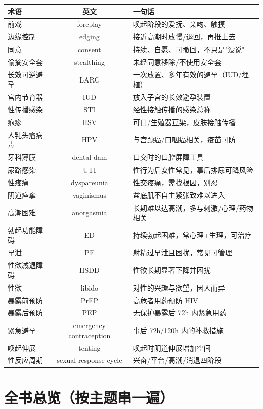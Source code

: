 \begin{tabularx}{\textwidth}{l C X}
\toprule
术语 & 英文 & 一句话 \\
\midrule
前戏 & foreplay & 唤起阶段的爱抚、亲吻、触摸 \\
边缘控制 & edging & 接近高潮时放慢/退回，再推上去 \\
同意 & consent & 持续、自愿、可撤回，不只是"没说" \\
偷摘安全套 & stealthing & 未经同意移除/不使用安全套 \\
长效可逆避孕 & LARC & 一次放置、多年有效的避孕（IUD/埋植） \\
宫内节育器 & IUD & 放入子宫的长效避孕装置 \\
性传播感染 & STI & 经性接触传播的感染总称 \\
疱疹 & HSV & 可口/生殖器互染，皮肤接触传播 \\
人乳头瘤病毒 & HPV & 与宫颈癌/口咽癌相关，疫苗可防 \\
牙科薄膜 & dental dam & 口交时的口腔屏障工具 \\
尿路感染 & UTI & 性行为后女性常见，事后排尿可降风险 \\
性疼痛 & dyspareunia & 性交疼痛，需找根因，别忍 \\
阴道痉挛 & vaginismus & 盆底肌不自主紧张致难以进入 \\
高潮困难 & anorgasmia & 长期难以达高潮，多与刺激/心理/药物相关 \\
勃起功能障碍 & ED & 持续勃起困难，常心理+生理，可治疗 \\
早泄 & PE & 射精过早泄且困扰，常见可管理 \\
性欲减退障碍 & HSDD & 性欲长期显著下降并困扰 \\
性欲 & libido & 对性的兴趣与欲望，因人而异 \\
暴露前预防 & PrEP & 高危者用药预防 HIV \\
暴露后预防 & PEP & 无保护暴露后 72h 内紧急用药 \\
紧急避孕 & emergency contraception & 事后 72h/120h 内的补救措施 \\
唤起伸展 & tenting & 唤起时阴道伸展增加空间 \\
性反应周期 & sexual response cycle & 兴奋/平台/高潮/消退四阶段 \\
\bottomrule
\end{tabularx}

\section{全书总览（按主题串一遍）}

